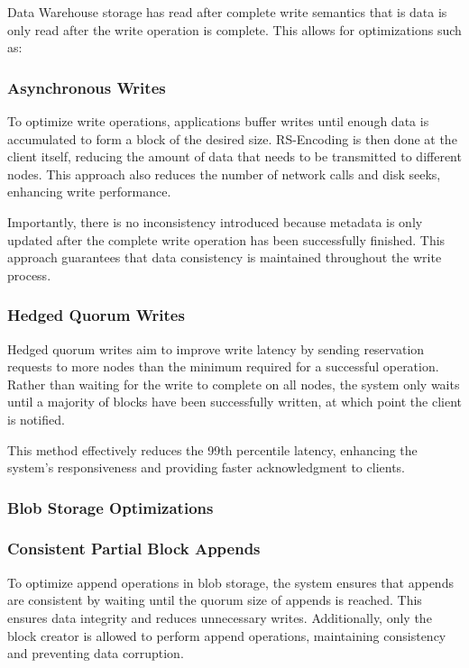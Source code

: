 Data Warehouse storage has read after complete write semantics that is data is only read after the write operation is complete. This allows for optimizations such as: 

\subsubsection*{Asynchronous Writes}\label{sec:asynchronous_writes}

To optimize write operations, applications buffer writes until enough data is accumulated to form a block of the desired size. RS-Encoding is then done at the client itself, reducing the amount of data that needs to be transmitted to different nodes. This approach also reduces the number of network calls and disk seeks, enhancing write performance.

Importantly, there is no inconsistency introduced because metadata is only updated after the complete write operation has been successfully finished. This approach guarantees that data consistency is maintained throughout the write process.

\subsubsection*{Hedged Quorum Writes}\label{sec:hedged_quorum_writes}

Hedged quorum writes aim to improve write latency by sending reservation requests to more nodes than the minimum required for a successful operation. Rather than waiting for the write to complete on all nodes, the system only waits until a majority of blocks have been successfully written, at which point the client is notified. 

This method effectively reduces the 99th percentile latency, enhancing the system's responsiveness and providing faster acknowledgment to clients.

\subsubsection{Blob Storage Optimizations}\label{sec:blob_storage_optimization}

\subsubsection*{Consistent Partial Block Appends}\label{sec:consistent_partial_block_appends}

To optimize append operations in blob storage, the system ensures that appends are consistent by waiting until the quorum size of appends is reached. This ensures data integrity and reduces unnecessary writes. Additionally, only the block creator is allowed to perform append operations, maintaining consistency and preventing data corruption.

